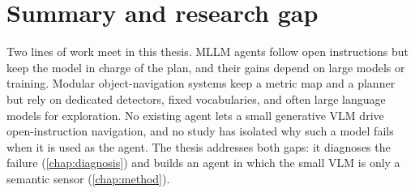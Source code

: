 \section{Summary and research gap}
\label{sec:lit-gap}
Two lines of work meet in this thesis. MLLM agents follow open instructions but keep the model in charge of the plan,
and their gains depend on large models or training. Modular object-navigation systems keep a metric map and a
planner but rely on dedicated detectors, fixed vocabularies, and often large language models for exploration. No
existing agent lets a small generative VLM drive open-instruction navigation, and no study has isolated why such a
model fails when it is used as the agent. The thesis addresses both gaps: it diagnoses the failure
(\cref{chap:diagnosis}) and builds an agent in which the small VLM is only a semantic sensor (\cref{chap:method}).
